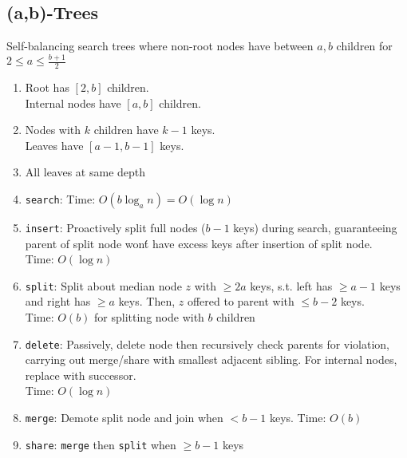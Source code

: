 \documentclass[12pt, a4paper]{article}
\begin{document}
\begin{multicols*}{3}
\subsection{(a,b)-Trees}
Self-balancing search trees where non-root nodes have between $a, b$ children for $2 \leq a \leq \frac{b+1}{2}$
\begin{enumerate}[\roman*.]
  \item Root has $[2, b]$ children.\\Internal nodes have $[a, b]$ children.
  \item Nodes with $k$ children have $k-1$ keys.\\Leaves have $[a-1,b-1]$ keys.
  \item All leaves at same depth
  \item \lstinline|search|: Time: $O(b\log_a n) = O(\log n)$
  \item \lstinline|insert|: Proactively split full nodes ($b-1$ keys) during search, guaranteeing parent of split node won\'t have excess keys after insertion of split node.\\Time: $O(\log n)$
  \item \lstinline|split|: Split about median node $z$ with $\geq 2a$ keys, s.t. left has $\geq a-1$ keys and right has $\geq a$ keys. Then, $z$ offered to parent with $\leq b-2$ keys.\\
    Time: $O(b)$ for splitting node with $b$ children
  \item \lstinline|delete|: Passively, delete node then recursively check parents for violation, carrying out merge/share with smallest adjacent sibling. For internal nodes, replace with successor.\\Time: $O(\log n)$ 
  \item \lstinline|merge|: Demote split node and join when $< b-1$ keys. Time: $O(b)$ 
  \item \lstinline|share|: \lstinline|merge| then \lstinline|split| when $\geq b-1$ keys
\end{enumerate}

\end{multicols*}
\end{document}
